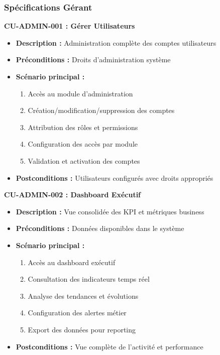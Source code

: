 \subsubsection{Spécifications Gérant}

\textbf{CU-ADMIN-001 : Gérer Utilisateurs}
\begin{itemize}
    \item \textbf{Description :} Administration complète des comptes utilisateurs
    \item \textbf{Préconditions :} Droits d'administration système
    \item \textbf{Scénario principal :}
    \begin{enumerate}
        \item Accès au module d'administration
        \item Création/modification/suppression des comptes
        \item Attribution des rôles et permissions
        \item Configuration des accès par module
        \item Validation et activation des comptes
    \end{enumerate}
    \item \textbf{Postconditions :} Utilisateurs configurés avec droits appropriés
\end{itemize}

\textbf{CU-ADMIN-002 : Dashboard Exécutif}
\begin{itemize}
    \item \textbf{Description :} Vue consolidée des KPI et métriques business
    \item \textbf{Préconditions :} Données disponibles dans le système
    \item \textbf{Scénario principal :}
    \begin{enumerate}
        \item Accès au dashboard exécutif
        \item Consultation des indicateurs temps réel
        \item Analyse des tendances et évolutions
        \item Configuration des alertes métier
        \item Export des données pour reporting
    \end{enumerate}
    \item \textbf{Postconditions :} Vue complète de l'activité et performance
\end{itemize}


